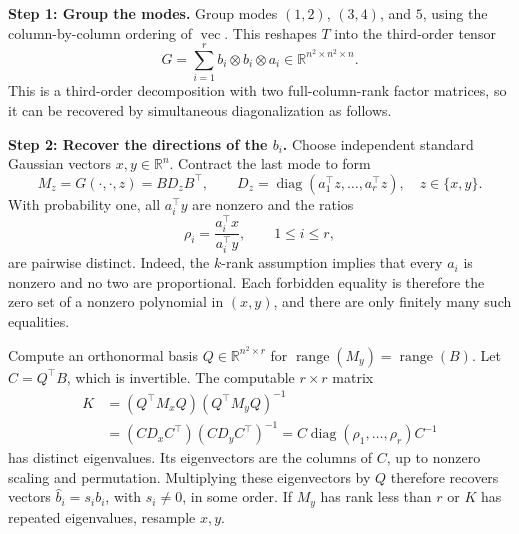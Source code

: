 \documentclass[12pt]{article}
\theoremstyle{plain}
\theoremstyle{definition}
\begin{document}
\begin{enumerate}
    \textbf{Step 1: Group the modes.}
    Group modes \((1,2)\), \((3,4)\), and \(5\), using the
    column-by-column ordering of \(\operatorname{vec}\). This reshapes
    \(T\) into the third-order tensor
    \[
    G=\sum_{i=1}^r b_i\otimes b_i\otimes a_i
    \in\mathbb R^{n^2\times n^2\times n}.
    \]
    This is a third-order decomposition with two full-column-rank
    factor matrices, so it can be recovered by simultaneous
    diagonalization as follows.

    \textbf{Step 2: Recover the directions of the \(b_i\).}
    Choose independent standard Gaussian vectors \(x,y\in\mathbb R^n\).
    Contract the last mode to form
    \[
    M_z=G(\cdot,\cdot,z)
       =B D_z B^\top,\qquad
    D_z=\operatorname{diag}(a_1^\top z,\ldots,a_r^\top z),
    \quad z\in\{x,y\}.
    \]
    With probability one, all \(a_i^\top y\) are nonzero and the
    ratios
    \[
    \rho_i=\frac{a_i^\top x}{a_i^\top y},\qquad 1\leq i\leq r,
    \]
    are pairwise distinct. Indeed, the \(k\)-rank assumption implies
    that every \(a_i\) is nonzero and no two are proportional.
    Each forbidden equality is therefore the zero set of a nonzero
    polynomial in \((x,y)\), and there are only finitely many such
    equalities.

    Compute an orthonormal basis
    \(Q\in\mathbb R^{n^2\times r}\) for
    \(\operatorname{range}(M_y)=\operatorname{range}(B)\).
    Let \(C=Q^\top B\), which is invertible. The computable
    \(r\times r\) matrix
    \begin{align*}
    K&=(Q^\top M_xQ)(Q^\top M_yQ)^{-1}\\
     &=(C D_x C^\top)(C D_y C^\top)^{-1}
      =C\operatorname{diag}(\rho_1,\ldots,\rho_r)C^{-1}
    \end{align*}
    has distinct eigenvalues. Its eigenvectors are the columns of
    \(C\), up to nonzero scaling and permutation. Multiplying these
    eigenvectors by \(Q\) therefore recovers vectors
    \(\widehat b_i=s_i b_i\), with \(s_i\ne0\), in some order.
    If \(M_y\) has rank less than \(r\) or \(K\) has repeated
    eigenvalues, resample \(x,y\).


\end{enumerate}
\end{document}
